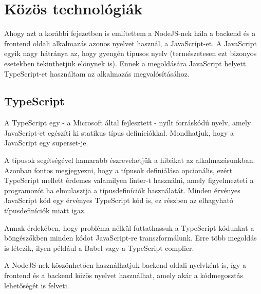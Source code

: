 \section{Közös technológiák}
Ahogy azt a korábbi fejezetben is említettem a NodeJS-nek hála a backend és a frontend oldali alkalmazás azonos nyelvet használ, a JavaScript-et.
A JavaScript egyik nagy hátránya az, hogy gyengén típusos nyelv (természetesen ezt bizonyos esetekben tekinthetjük elönynek is). Ennek a megoldására JavaScript helyett TypeScript-et használtam az alkalmazás megvalósításához.

\subsection{TypeScript}

A TypeScript egy - a Microsoft által fejlesztett - nyílt forráskódú nyelv, amely JavaScript-et egészíti ki statikus típus definíciókkal. Mondhatjuk, hogy a JavaScript egy superset-je.

A típusok segítségével hamarabb észrevehetjük a hibákat az alkalmazásunkban. Azonban fontos megjegyezni, hogy a típusok definiálása opcionális, ezért TypeScript mellett érdemes valamilyen linter-t használni, amely figyelmezteti a programozót ha elmulasztja a típusdefiníciók használatát. 
Minden érvényes JavaScript kód egy érvényes TypeScript kód is, ez részben az elhagyható típusdefiníciók miatt igaz.

Annak érdekében, hogy probléma nélkül futtathassuk a TypeScript kódunkat a böngészőkben minden kódot JavaScript-re transzformálunk. Erre több megoldás is létezik, ilyen például a Babel vagy a TypeScript complier.

A NodeJS-nek köszönhetően használhatjuk backend oldali nyelvként is, így a frontend és a backend közös nyelvet használhat, amely akár a kódmegosztás lehetőségét is felveti.
